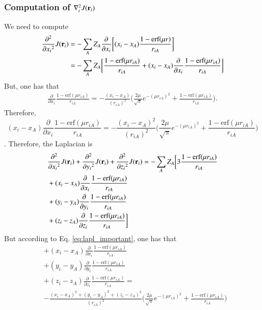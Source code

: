 \documentclass[aip,jcp,reprint,noshowkeys,superscriptaddress]{revtex4-1}
\newcommand{\deriv}[3]{\frac{\partial^{#3} #1}{\partial {#2}^{#3}}}
\newcommand{\br}[0]{{\bf {r}}}
\begin{document}
\subsubsection{Computation of $\nabla^2_i J(\br{}_i) $}
We need to compute 
\begin{equation}
 \begin{aligned}
 \deriv{}{x_{i}}{2} J(\br{}_i) & = -\sum_A Z_A \deriv{}{x_i}{} \bigg[(x_i - x_A) \frac{1 - \text{erf}(\mu r)}{r_{iA}} \bigg] \\
                               & = -\sum_A Z_A \bigg[ \frac{1 - \text{erf}(\mu r_{iA})}{r_{iA}} + (x_i - x_A) \deriv{}{x_i}{}\frac{1 - \text{erf}(\mu r_{iA})}{r_{iA}}  \bigg]
 \end{aligned}
\end{equation}
But, one has that
\begin{equation}
 \begin{aligned}
 \deriv{}{x_i}{} \frac{1 - \text{erf}(\mu r_{iA})}{r_{iA}} = - \frac{(x_i - x_A)}{(r_{iA})^2} \bigg( \frac{2 \mu}{\sqrt{\pi}} e^{-(\mu r_{iA})^2} + \frac{1 - \text{erf}(\mu r_{iA})}{r_{iA}}\bigg).
 \end{aligned}
\end{equation}
Therefore, 
\begin{equation}
 \label{eq:lapl_important}
 (x_i - x_A) \deriv{}{x_i}{}\frac{1 - \text{erf}(\mu r_{iA})}{r_{iA}} = - \frac{(x_i - x_A)^2}{(r_{iA})^2} \bigg( \frac{2 \mu}{\sqrt{\pi}} e^{-(\mu r_{iA})^2} + \frac{1 - \text{erf}(\mu r_{iA})}{r_{iA}}\bigg)
\end{equation}.
Therefore, the Laplacian is 
\begin{equation}
 \begin{aligned}
 \label{eq:lapl_interm_1}
&  \deriv{}{x_{i}}{2} J(\br{}_i) + \deriv{}{y_{i}}{2} J(\br{}_i) + \deriv{}{z_{i}}{2} J(\br{}_i) =  - \sum_{A} Z_A \bigg[ 3 \frac{1 - \text{erf}(\mu r_{iA})}{r_{iA}}  \\
 & + (x_i - x_A) \deriv{}{x_i}{}\frac{1 - \text{erf}(\mu r_{iA})}{r_{iA}} \\ 
 & + (y_i - y_A) \deriv{}{y_i}{}\frac{1 - \text{erf}(\mu r_{iA})}{r_{iA}} \\ 
 & + (z_i - z_A) \deriv{}{z_i}{}\frac{1 - \text{erf}(\mu r_{iA})}{r_{iA}}  \bigg]
 \end{aligned}
\end{equation}
But according to Eq. \eqref{eq:lapl_important}, one has that 
\begin{equation}
 \begin{aligned}
 & + (x_i - x_A) \deriv{}{x_i}{}\frac{1 - \text{erf}(\mu r_{iA})}{r_{iA}} \\ 
 & + (y_i - y_A) \deriv{}{y_i}{}\frac{1 - \text{erf}(\mu r_{iA})}{r_{iA}} \\ 
 & + (z_i - z_A) \deriv{}{z_i}{}\frac{1 - \text{erf}(\mu r_{iA})}{r_{iA}}  = \\
 &- \frac{(x_i - x_A)^2 + (y_i - y_A)^2 + (z_i - z_A)^2}{(r_{iA})^2} \bigg( \frac{2 \mu}{\sqrt{\pi}} e^{-(\mu r_{iA})^2} + \frac{1 - \text{erf}(\mu r_{iA})}{r_{iA}}\bigg)
 \end{aligned}
\end{equation}
\end{document}

